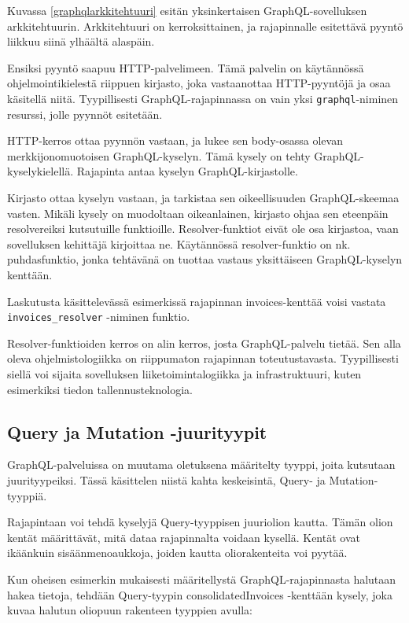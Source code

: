 Kuvassa \ref{graphqlarkkitehtuuri} esitän yksinkertaisen
GraphQL-sovelluksen arkkitehtuurin. Arkkitehtuuri on kerroksittainen, ja
rajapinnalle esitettävä pyyntö liikkuu siinä ylhäältä alaspäin.

Ensiksi pyyntö saapuu HTTP-palvelimeen. Tämä palvelin on käytännössä
ohjelmointikielestä riippuen kirjasto, joka vastaanottaa HTTP-pyyntöjä
ja osaa käsitellä niitä. Tyypillisesti GraphQL-rajapinnassa on vain yksi
\texttt{graphql}-niminen resurssi, jolle pyynnöt esitetään.

HTTP-kerros ottaa pyynnön vastaan, ja lukee sen body-osassa olevan
merkkijonomuotoisen GraphQL-kyselyn. Tämä kysely on tehty
GraphQL-kyselykielellä. Rajapinta antaa kyselyn GraphQL-kirjastolle.

Kirjasto ottaa kyselyn vastaan, ja tarkistaa sen oikeellisuuden
GraphQL-skeemaa vasten. Mikäli kysely on muodoltaan oikeanlainen,
kirjasto ohjaa sen eteenpäin resolvereiksi kutsutuille funktioille.
Resolver-funktiot eivät ole osa kirjastoa, vaan sovelluksen kehittäjä
kirjoittaa ne. Käytännössä resolver-funktio on nk. \gls{puhdasfunktio},
jonka tehtävänä on tuottaa vastaus yksittäiseen GraphQL-kyselyn
kenttään.

Laskutusta käsittelevässä esimerkissä rajapinnan invoices-kenttää voisi
vastata \texttt{invoices\_resolver} -niminen funktio.

Resolver-funktioiden kerros on alin kerros, josta GraphQL-palvelu
tietää. Sen alla oleva ohjelmistologiikka on riippumaton rajapinnan
toteutustavasta. Tyypillisesti siellä voi sijaita sovelluksen
liiketoimintalogiikka ja infrastruktuuri, kuten esimerkiksi tiedon
tallennusteknologia.

\hypertarget{query-ja-mutation--juurityypit}{%
\subsection{Query ja Mutation
-juurityypit}\label{query-ja-mutation--juurityypit}}

GraphQL-palveluissa on muutama oletuksena määritelty tyyppi, joita
kutsutaan juurityypeiksi. Tässä käsittelen niistä kahta keskeisintä,
Query- ja Mutation-tyyppiä.

Rajapintaan voi tehdä kyselyjä Query-tyyppisen juuriolion kautta. Tämän
olion kentät määrittävät, mitä dataa rajapinnalta voidaan kysellä.
Kentät ovat ikäänkuin sisäänmenoaukkoja, joiden kautta oliorakenteita
voi pyytää.

Kun oheisen esimerkin mukaisesti määritellystä GraphQL-rajapinnasta
halutaan hakea tietoja, tehdään Query-tyypin consolidatedInvoices
-kenttään kysely, joka kuvaa halutun oliopuun rakenteen tyyppien avulla:

